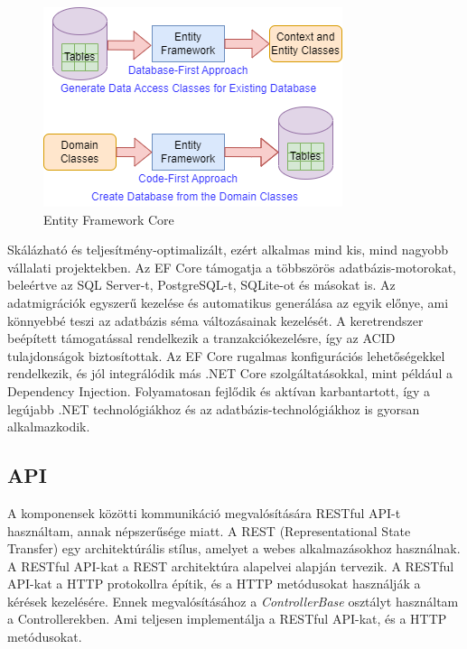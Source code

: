 \begin{figure}[H]
    \centering
    \includegraphics[width=14.0truecm]{images/EntityFramework.png}
    \caption{Entity Framework Core}
    \label{fig:entity_framework_core}
\end{figure}

Skálázható és teljesítmény-optimalizált, ezért alkalmas mind kis,
mind nagyobb vállalati projektekben. Az EF Core támogatja a többszörös adatbázis-motorokat, beleértve az SQL Server-t, PostgreSQL-t, SQLite-ot és másokat is.
Az adatmigrációk egyszerű kezelése és automatikus generálása az egyik előnye, ami könnyebbé teszi az adatbázis séma változásainak kezelését.
A keretrendszer beépített támogatással rendelkezik a tranzakciókezelésre, így az ACID tulajdonságok biztosítottak. Az EF Core rugalmas konfigurációs lehetőségekkel rendelkezik,
és jól integrálódik más .NET Core szolgáltatásokkal, mint például a Dependency Injection. Folyamatosan fejlődik és aktívan karbantartott,
így a legújabb .NET technológiákhoz és az adatbázis-technológiákhoz is gyorsan alkalmazkodik.

\subsection{API}
A komponensek közötti kommunikáció megvalósítására RESTful API-t használtam, annak népszerűsége miatt. A REST (Representational State Transfer) egy architektúrális stílus,
amelyet a webes alkalmazásokhoz használnak. A RESTful API-kat a REST architektúra alapelvei alapján tervezik.
A RESTful API-kat a HTTP protokollra építik, és a HTTP metódusokat használják a kérések kezelésére.
Ennek megvalósításához a \textit{ControllerBase} osztályt használtam a Controllerekben.
Ami teljesen implementálja a RESTful API-kat, és a HTTP metódusokat.

